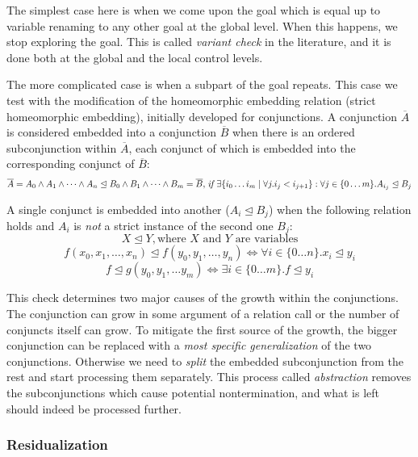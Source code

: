 The simplest case here is when we come upon the goal which is equal up to variable renaming to any other goal at the global level. 
When this happens, we stop exploring the goal. 
This is called \emph{variant check} in the literature, and it is done both at the global and the local control levels. 

The more complicated case is when a subpart of the goal repeats. 
This case we test with the modification of the homeomorphic embedding relation (strict homeomorphic embedding), initially developed for conjunctions. 
A conjunction $\overline{A}$ is considered embedded into a conjunction $\overline{B}$ when there is an ordered subconjunction within $\overline{A}$, each conjunct of which is embedded into the corresponding conjunct of $\overline{B}$:
\[
\overline{A} = A_0 \wedge A_1 \wedge \dots \wedge A_n \trianglelefteq B_0 \wedge B_1 \wedge \dots \wedge B_m = \overline{B}, \, i\!f \, \exists \{ i_0 \dots i_m \mid \forall j.  i_j < i_{j+1} \}: \forall j \in \{0 \dots m\}. A_{i_j} \trianglelefteq B_j 
\]

A single conjunct is embedded into another ($A_i \trianglelefteq B_j$) when the following relation holds and $A_i$ is \emph{not} a strict instance of the second one $B_j$: 
\[
X \trianglelefteq Y, \text{where } X \text{ and } Y \text{ are variables}
\]
\[
f(x_0, x_1, \dots, x_n) \trianglelefteq f (y_0, y_1, \dots, y_n) \Leftrightarrow \forall i \in \{ 0 \dots n \}. x_i \trianglelefteq y_i
\]
\[
f \trianglelefteq g( y_0, y_1, \dots y_m) \Leftrightarrow \exists i \in \{ 0 \dots m \}. f \trianglelefteq y_i
\]

This check determines two major causes of the growth within the conjunctions. 
The conjunction can grow in some argument of a relation call or the number of conjuncts itself can grow. 
To mitigate the first source of the growth, the bigger conjunction can be replaced with a \emph{most specific generalization} of the two conjunctions.
Otherwise we need to \emph{split} the embedded subconjunction from the rest and start processing them separately. 
This process called \emph{abstraction} removes the subconjunctions which cause potential nontermination, and what is left should indeed be processed further.

\subsubsection{Residualization}

